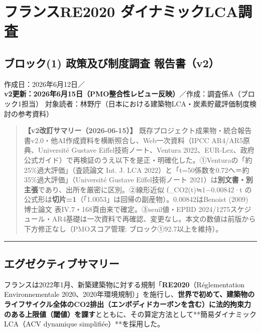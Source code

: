 \hypertarget{ux30d5ux30e9ux30f3ux30b9re2020-ux30c0ux30a4ux30caux30dfux30c3ux30aflcaux8abfux67fb}{%
\section{フランスRE2020
ダイナミックLCA調査}\label{ux30d5ux30e9ux30f3ux30b9re2020-ux30c0ux30a4ux30caux30dfux30c3ux30aflcaux8abfux67fb}}

\hypertarget{ux30d6ux30edux30c3ux30af1-ux653fux7b56ux53caux3073ux5236ux5ea6ux8abfux67fb-ux5831ux544aux66f8v2}{%
\subsection{ブロック(1) 政策及び制度調査
報告書（v2）}\label{ux30d6ux30edux30c3ux30af1-ux653fux7b56ux53caux3073ux5236ux5ea6ux8abfux67fb-ux5831ux544aux66f8v2}}

作成日：2026年6月12日／\textbf{v2更新：2026年6月15日（PMO整合性レビュー反映）}／作成：調査係A（ブロック1担当）
対象読者：林野庁（日本における建築物LCA・炭素貯蔵評価制度検討の参考資料）

\begin{quote}
\textbf{【v2改訂サマリー（2026-06-15）】}
既存プロジェクト成果物・統合報告書v2.0・他AI作成資料を横断照合し、Web一次資料（IPCC
AR4/AR5原典、Université Gustave Eiffel技術ノート、Ventura
2022、EUR-Lex、政府公式ガイド）で再検証のうえ以下を是正・明確化した。①Venturaの「約25\%過大評価」（査読論文
Int. J. LCA 2022）と「t=50係数を0.72へ＝約35\%過大評価」（Université
Gustave Eiffel技術ノート
2021）は\textbf{別文書・別主張}であり、出所を厳密に区別。②線形近似
f\_CO2(t)≒1−0.00842·t
の公式形は\textbf{切片=1}（「1.0053」は回帰の副産物）。0.00842はBenoist
(2009) 博士論文 表IV.7・168頁由来で確定。③seuil値・EPBD
2024/1275スケジュール・AR4基礎は一次資料で再確認、変更なし。本文の数値は前版から下方修正なし（PMOスコア管理:
ブロック①92.7以上を維持）。
\end{quote}

\begin{center}\rule{0.5\linewidth}{0.5pt}\end{center}

\hypertarget{ux30a8ux30b0ux30bcux30afux30c6ux30a3ux30d6ux30b5ux30deux30eaux30fc}{%
\subsection{エグゼクティブサマリー}\label{ux30a8ux30b0ux30bcux30afux30c6ux30a3ux30d6ux30b5ux30deux30eaux30fc}}

フランスは2022年1月、新築建築物に対する規制「\textbf{RE2020}（Réglementation
Environnementale
2020、2020年環境規制）」を施行し、\textbf{世界で初めて、建築物のライフサイクル全体のCO2排出（エンボディドカーボンを含む）に法的拘束力のある上限値（閾値）を課す}とともに、その算定方法として**簡易ダイナミックLCA（ACV
dynamique simplifiée）**を採用した。

